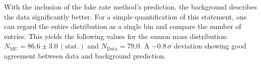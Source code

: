 With the inclusion of the fake rate method's prediction, the background describes the data significantly better. For a simple quantification of this statement, one can regard the entire distribution as a single bin and compare the number of entries. This yields the following values for the smuon mass distribution: $N_{\text{MC}} = 86.6 \pm 3.0\,(\text{stat.})$ and $N_{\text{Data}} = 79.0$. A $-0.8\,\sigma$ deviation showing good agreement between data and background prediction.


